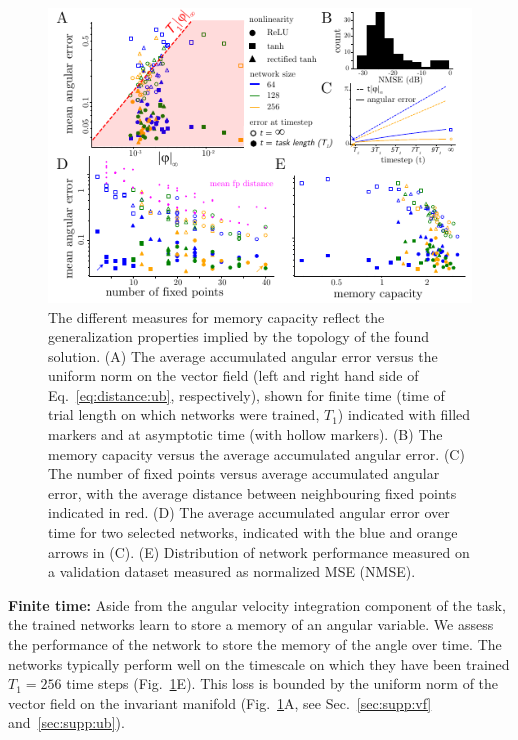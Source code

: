 \documentclass{article} %
\newcommand{\ptitle}[1]{\textbf{#1:}\xspace}
\newcounter{ct}
\theoremstyle{definition}
\theoremstyle{remark}
\begin{document}
\setlength\belowcaptionskip{-3ex}
\begin{figure}[tbhp]
  \centering
  \includegraphics[width=\textwidth]{angular_losses2}
  \caption{The different measures for memory capacity reflect the generalization properties implied by the topology of the found solution.
  (A) The average accumulated angular error versus the uniform norm on the vector field (left and right hand side of Eq.~\ref{eq:distance:ub}, respectively), shown for finite time (time of trial length on which networks were trained, \(T_1\)) indicated with filled markers and at asymptotic time (with hollow markers).
  (B) The memory capacity versus the average accumulated angular error.
  (C) The number of fixed points versus average accumulated angular error, with the average distance between neighbouring fixed points indicated in red.
  (D) The average accumulated angular error over time for two selected networks, indicated with the blue and orange arrows in (C).
  (E) Distribution of network performance measured on a validation dataset measured as normalized MSE (NMSE).
  }\label{fig:angular_loss}
\end{figure}
\setlength{\parskip}{0mm}

\ptitle{Finite time}
Aside from the angular velocity integration component of the task, the trained networks learn to store a memory of an angular variable.
We assess the performance of the network to store the memory of the angle over time.
The networks typically perform well on the timescale on which they have been trained \(T_1=256\) time steps (Fig.~\ref{fig:angular_loss}E).
%
This loss is bounded by the uniform norm of the vector field on the invariant manifold (Fig.~\ref{fig:angular_loss}A,  see Sec.~\ref{sec:supp:vf} and~\ref{sec:supp:ub}).
\setlength{\parskip}{2mm}
\end{document}
